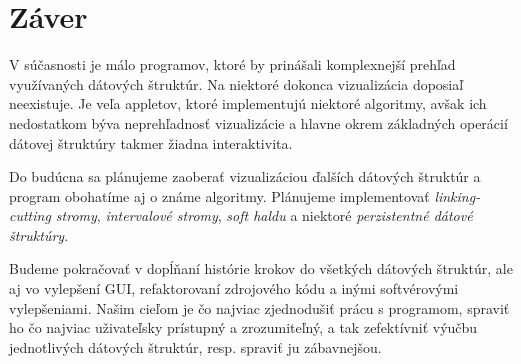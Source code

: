 \section{Záver}

V súčasnosti je málo programov, ktoré by prinášali komplexnejší prehľad 
využívaných dátových štruktúr. Na niektoré dokonca vizualizácia doposiaľ 
neexistuje. Je veľa appletov, ktoré implementujú niektoré algoritmy, avšak 
ich nedostatkom býva neprehľadnosť vizualizácie a hlavne okrem základných 
operácií dátovej štruktúry takmer žiadna interaktivita. 

Do budúcna sa plánujeme zaoberať vizualizáciou ďalších dátových 
štruktúr a program obohatíme aj o známe algoritmy. Plánujeme implementovať 
\emph{linking-cutting stromy}, \emph{intervalové stromy}, \emph{soft haldu} 
a niektoré \emph{perzistentné dátové štruktúry}.

Budeme pokračovať v 
dopĺňaní histórie krokov do všetkých dátových štruktúr, ale aj vo vylepšení 
GUI, refaktorovaní zdrojového kódu a inými softvérovými vylepšeniami. Našim 
cieľom je čo najviac zjednodušiť prácu s programom, spraviť ho čo najviac 
uživateľsky prístupný a zrozumiteľný, a tak zefektívniť výučbu 
jednotlivých dátových štruktúr, resp. spraviť ju zábavnejšou.
